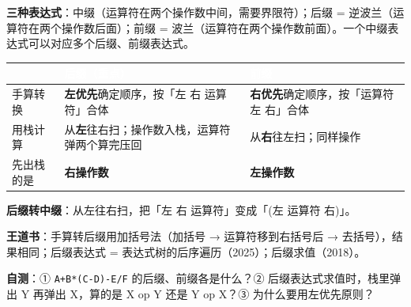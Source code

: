 \documentclass[10.5pt,a4paper,oneside]{article}
\newcommand{\hlred}[1]{\textcolor{wdred}{\bfseries #1}}
\begin{document}
\begin{summarybox}

\textbf{三种表达式}：中缀（运算符在两个操作数中间，需要界限符）；后缀 =
逆波兰（运算符在两个操作数后面）；前缀 =
波兰（运算符在两个操作数前面）。一个中缀表达式可以对应多个后缀、前缀表达式。

{
\begin{xltabular}{\linewidth}{>{\hsize\raggedright\arraybackslash}X>{\hsize\raggedright\arraybackslash}X>{\hsize\raggedright\arraybackslash}X}
\textcolor{white}{\bfseries } & \textcolor{white}{\bfseries 后缀（重点）} & \textcolor{white}{\bfseries 前缀} \\
\endfirsthead
手算转换 & \textbf{左优先}确定顺序，按「左 右 运算符」合体 & \textbf{右优先}确定顺序，按「运算符 左 右」合体 \\ \hline
用栈计算 & 从\textbf{左}往右扫；操作数入栈，运算符弹两个算完压回 & 从\textbf{右}往左扫；同样操作 \\ \hline
先出栈的是 & \hlred{右操作数} & \hlred{左操作数} \\ \hline
\end{xltabular}\par\vspace{4pt}}

\textbf{后缀转中缀}：从左往右扫，把「左 右 运算符」变成「(左 运算符
右)」。

\textbf{王道书}：手算转后缀用加括号法（加括号 → 运算符移到右括号后 →
去括号），结果相同；后缀表达式 =
表达式树的后序遍历（2025）；后缀求值（2018）。

\textbf{自测}：① \texttt{A+B*(C-D)-E/F} 的后缀、前缀各是什么？②
后缀表达式求值时，栈里弹出 Y 再弹出 X，算的是 X op Y 还是 Y op X？③
为什么要用左优先原则？

\end{summarybox}
\end{document}
